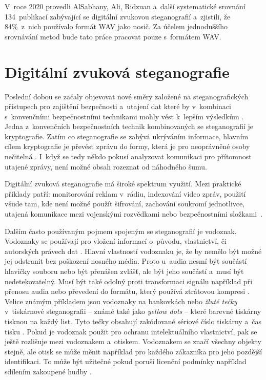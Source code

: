 V~roce 2020 provedli AlSabhany, Ali, Ridzuan a~další \cite{AlSabhany2020}
systematické srovnání 134~publikací zabývající se digitální zvukovou
steganografií a~zjistili, že 84\%~z~nich používalo formát WAV jako nosič. Za
účelem jednoduššího srovnávání metod bude tato práce pracovat pouze s~formátem
WAV.

\section{Digitální zvuková steganografie}
\label{sec:digital-audio-steganography}

Poslední dobou se začaly objevovat nové směry založené na steganografických
přístupech pro zajištění bezpečnosti a~utajení dat které by v~kombinaci
s~konvenčními bezpečnostními technikami mohly vést k~lepším výsledkům
\cite{Djebbar2012}. Jedna z~konvenčních bezpečnostních technik kombinovaných se
steganografií je kryptografie. Zatím co steganografie se zabývá ukrýváním
informace, hlavním cílem kryptografie je převést zprávu do formy, která je pro
neoprávněné osoby nečitelná \cite{AlSabhany2020}. I~když se tedy někdo pokusí
analyzovat komunikaci pro přítomnost utajené zprávy, není možné obsah rozeznat
od náhodného šumu.

Digitální zvuková steganografie má široké spektrum využití. Mezi praktické
příklady patří: monitorování reklam v~rádiu, indexování video zpráv, použití
všude tam, kde není možné použít šifrování, zachování soukromí jednotlivce,
utajená komunikace mezi vojenskými rozvědkami nebo bezpečnostními
složkami~\cite{Dutta2020}.

Dalším často používaným pojmem spojeným se steganografií je vodoznak. Vodoznaky
se používají pro vložení informací o~původu, vlastnictví, či autorských právech
dat \cite{Djebbar2012}\cite{Dutta2020}\cite{Swanson1998}. Hlavní vlastností
vodoznaku je, že by nemělo být možné jej odstranit bez poškození nosného média.
Proto u~audia nesmí být součástí hlavičky souboru nebo být přenášen zvlášť, ale
být jeho součástí a~musí být nedetekovatelný. Musí být také odolný proti
transformaci signálu například při přenosu audia nebo převedení do formátu,
který používá ztrátovou kompresi \cite{Swanson1998}. Velice známým příkladem
jsou vodoznaky na bankovkách nebo \textit{žluté tečky} v~tiskárnové
steganografii -- známé také jako \textit{yellow dots} -- které barevné tiskárny
tisknou na každý list. Tyto tečky obsahují zakódované sériové číslo tiskárny
a~čas tisku \cite{Dutta2020}. Pokud je vodoznak použit pro ochranu
intelektuálního vlastnictví, pak se ještě rozlišuje mezi vodoznakem a~otiskem.
Vodoznakem se značí všechny objekty stejně, ale otisk se může měnit například
pro každého zákazníka pro jeho pozdější identifikaci. To může být užitečné
pokud poruší licenční podmínky například sdílením zakoupené hudby
\cite{Swanson1998}.

